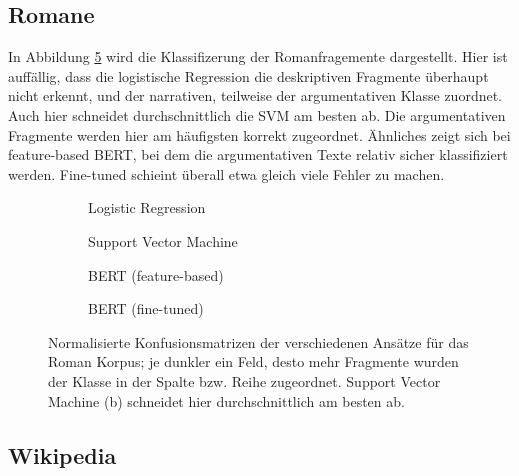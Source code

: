 
\subsection{Romane}
\label{romane_diskussion}
In Abbildung \ref{fig:roman} wird die Klassifizerung der Romanfragemente dargestellt. Hier ist auffällig, dass die logistische Regression die deskriptiven Fragmente überhaupt nicht erkennt, und der narrativen, teilweise der argumentativen Klasse zuordnet. Auch hier schneidet durchschnittlich die SVM am besten ab. Die argumentativen Fragmente werden hier am häufigsten korrekt zugeordnet. Ähnliches zeigt sich bei feature-based BERT, bei dem die argumentativen Texte relativ sicher klassifiziert werden. Fine-tuned schieint überall etwa gleich viele Fehler zu machen.



\begin{figure}
\centering
\begin{subfigure}[b]{.45\linewidth}

\caption{Logistic Regression}\label{fig:romane-log}
\end{subfigure}
\begin{subfigure}[b]{.45\linewidth}

\caption{Support Vector Machine}\label{fig:romane-svm}
\end{subfigure}

\begin{subfigure}[b]{.45\linewidth}

\caption{BERT (feature-based)}\label{fig:romane-feat}
\end{subfigure}
\begin{subfigure}[b]{.45\linewidth}

\caption{BERT (fine-tuned)}\label{fig:romane-fine}
\end{subfigure}
\caption{Normalisierte Konfusionsmatrizen der verschiedenen Ansätze für das Roman Korpus; je dunkler ein Feld, desto mehr Fragmente wurden der Klasse in der Spalte bzw. Reihe zugeordnet. Support Vector Machine (b) schneidet hier durchschnittlich am besten ab.}
\label{fig:roman}
\end{figure}




\subsection{Wikipedia}
\label{wikipedia_diskussion}

